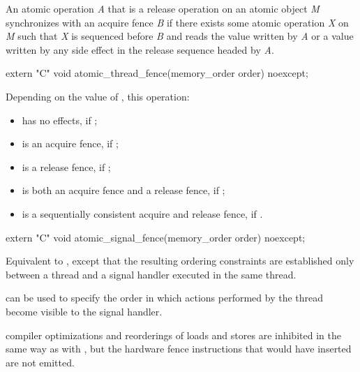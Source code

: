 \pnum
An atomic operation \textit{A} that is a release operation on an atomic object
\textit{M} synchronizes with an acquire fence \textit{B} if there exists some atomic
operation \textit{X} on \textit{M} such that \textit{X} is sequenced before \textit{B}
and reads the value written by \textit{A} or a value written by any side effect in the
release sequence headed by \textit{A}.

%
\begin{itemdecl}
extern "C" void atomic_thread_fence(memory_order order) noexcept;
\end{itemdecl}

\begin{itemdescr}
\pnum
\effects Depending on the value of , this operation:

\begin{itemize}
\item has no effects, if ;

\item is an acquire fence, if ;

\item is a release fence, if ;

\item is both an acquire fence and a release fence, if ;

\item is a sequentially consistent acquire and release fence, if .
\end{itemize}
\end{itemdescr}

%
\begin{itemdecl}
extern "C" void atomic_signal_fence(memory_order order) noexcept;
\end{itemdecl}

\begin{itemdescr}
\pnum
\effects Equivalent to , except that
the resulting ordering constraints are established only between a thread and a
signal handler executed in the same thread.

\pnum
\realnote {} can be used to specify the order in which actions
performed by the thread become visible to the signal handler.

\pnum
\realnote compiler optimizations and reorderings of loads and stores are inhibited in
the same way as with , but the hardware fence instructions
that  would have inserted are not emitted.
\end{itemdescr}
